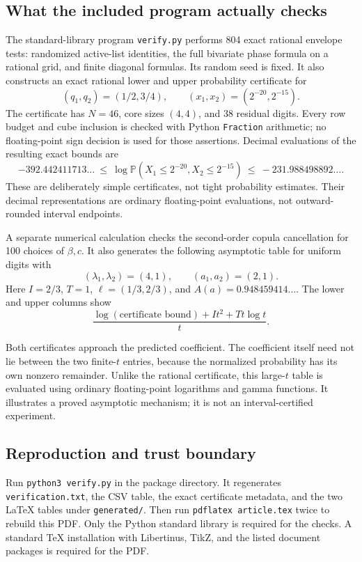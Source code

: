 \documentclass[11pt,a4paper]{article}
\theoremstyle{definition}
\theoremstyle{remark}
\newcommand{\PP}{\mathbb P}
\numberwithin{equation}{section}
\begin{document}
\subsection{What the included program actually checks}
The standard-library program \texttt{verify.py} performs 804 exact
rational envelope tests: randomized active-list identities, the full
bivariate phase formula on a rational grid, and finite diagonal formulas.
Its random seed is fixed. It also constructs an exact rational lower and
upper probability certificate for
\[
 (q_1,q_2)=(1/2,3/4),\qquad (x_1,x_2)=(2^{-20},2^{-15}).
\]
The certificate has $N=46$, core sizes $(4,4)$, and 38 residual digits.
Every row budget and cube inclusion is checked with Python
\texttt{Fraction} arithmetic; no floating-point sign decision is used
for those assertions. Decimal evaluations of the resulting exact bounds
are
\[
 -392.442411713\ldots\ \le\
 \log\PP(X_1\le2^{-20},X_2\le2^{-15})
 \ \le\ -231.988498892\ldots.
\]
These are deliberately simple certificates, not tight probability
estimates. Their decimal representations are ordinary floating-point
evaluations, not outward-rounded interval endpoints.

A separate numerical calculation checks the second-order copula
cancellation for 100 choices of $\beta,c$. It also generates the following
asymptotic table for uniform digits with
\[
 (\lambda_1,\lambda_2)=(4,1),\qquad (a_1,a_2)=(2,1).
\]
Here $I=2/3$, $T=1$, $\ell=(1/3,2/3)$, and
$A(a)=0.948459414\ldots$. The lower and upper columns show
\[
 \frac{\log(\text{certificate bound})+I t^2+Tt\log t}{t}.
\]
\begin{center}

\end{center}
Both certificates approach the predicted coefficient. The coefficient
itself need not lie between the two finite-$t$ entries, because the
normalized probability has its own nonzero remainder. Unlike the
rational certificate, this large-$t$ table is evaluated using ordinary
floating-point logarithms and gamma functions. It illustrates a proved
asymptotic mechanism; it is not an interval-certified experiment.

\subsection{Reproduction and trust boundary}
Run \texttt{python3 verify.py} in the package directory. It regenerates
\texttt{verification.txt}, the CSV table, the exact certificate metadata,
and the two LaTeX tables under \texttt{generated/}. Then run
\texttt{pdflatex article.tex} twice to rebuild this PDF. Only the Python
standard library is required for the checks. A standard TeX installation
with Libertinus, TikZ, and the listed document packages is required for
the PDF.
\end{document}

